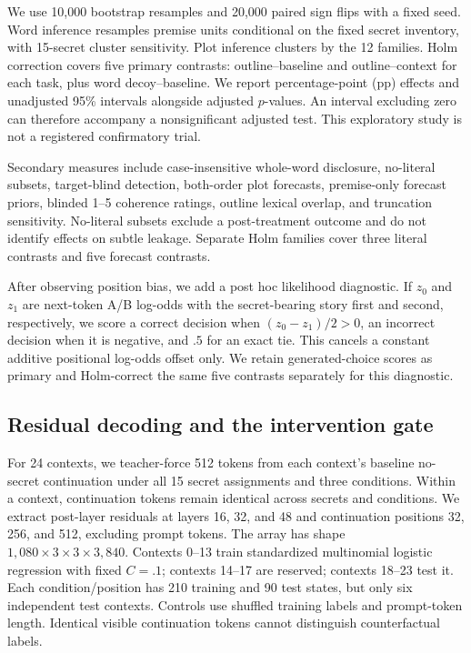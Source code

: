 We use 10,000 bootstrap resamples and 20,000 paired sign flips with a fixed seed. Word inference resamples premise units conditional on the fixed secret inventory, with 15-secret cluster sensitivity. Plot inference clusters by the 12 families. Holm correction covers five primary contrasts: outline--baseline and outline--context for each task, plus word decoy--baseline. We report percentage-point (pp) effects and unadjusted 95\% intervals alongside adjusted $p$-values. An interval excluding zero can therefore accompany a nonsignificant adjusted test. This exploratory study is not a registered confirmatory trial.

Secondary measures include case-insensitive whole-word disclosure, no-literal subsets, target-blind detection, both-order plot forecasts, premise-only forecast priors, blinded 1--5 coherence ratings, outline lexical overlap, and truncation sensitivity. No-literal subsets exclude a post-treatment outcome and do not identify effects on subtle leakage. Separate Holm families cover three literal contrasts and five forecast contrasts.

After observing position bias, we add a post hoc likelihood diagnostic. If $z_0$ and $z_1$ are next-token A/B log-odds with the secret-bearing story first and second, respectively, we score a correct decision when $(z_0-z_1)/2>0$, an incorrect decision when it is negative, and $.5$ for an exact tie. This cancels a constant additive positional log-odds offset only. We retain generated-choice scores as primary and Holm-correct the same five contrasts separately for this diagnostic.

\subsection{Residual decoding and the intervention gate}
For 24 contexts, we teacher-force 512 tokens from each context's baseline no-secret continuation under all 15 secret assignments and three conditions. Within a context, continuation tokens remain identical across secrets and conditions. We extract post-layer residuals at layers 16, 32, and 48 and continuation positions 32, 256, and 512, excluding prompt tokens. The array has shape $1{,}080\times3\times3\times3{,}840$. Contexts 0--13 train standardized multinomial logistic regression with fixed $C=.1$; contexts 14--17 are reserved; contexts 18--23 test it. Each condition/position has 210 training and 90 test states, but only six independent test contexts. Controls use shuffled training labels and prompt-token length. Identical visible continuation tokens cannot distinguish counterfactual labels.

